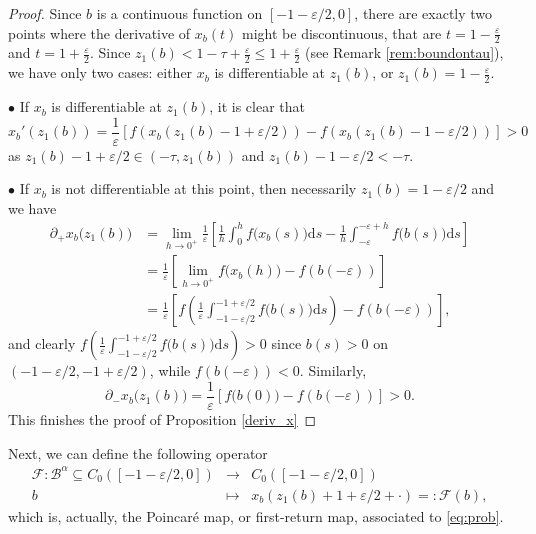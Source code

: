 \documentclass[a4paper,11pt]{article}
\theoremstyle{plain}
\theoremstyle{definition}
\theoremstyle{definition}
\newcommand{\B}{\mathcal{B}}
\newcommand{\Fcal}{\mathcal{F}}
\newcommand{\dd}{\mathrm{d}}
\numberwithin{equation}{section}
\begin{document}
\begin{proof}
	Since $b$ is a continuous function on $[-1-\varepsilon/2, 0]$, there are exactly two points where the derivative of $x_b(t)$ might be discontinuous, that are $t=1-\frac{\varepsilon}{2}$ and $t=1 +\frac{\varepsilon}{2}$. Since $z_1(b)< 1-\tau+\frac{\varepsilon}{2}\leq 1+\frac{\varepsilon}{2}$ (see Remark \ref{rem:boundontau}), we have only two cases: either $x_b$ is differentiable at $z_1(b)$, or $z_1(b)=1-\frac{\varepsilon}{2}$. 

	\noindent $\bullet$
If $x_b$ is differentiable at $z_1(b)$, it is clear that
\[
    x_b'(z_1(b)) = \frac{1}{\varepsilon}[ f(x_b(z_1(b)-1+\varepsilon/2)) - f(x_b(z_1(b)-1-\varepsilon/2)) ]>0
\]
	as $z_1(b)-1+\varepsilon/2\in(-\tau,z_1(b))$ and $z_1(b)-1-\varepsilon/2 < -\tau$. 

	\noindent$\bullet$ If $x_b$ is not differentiable at this point, then necessarily $z_1(b)=1-\varepsilon/2$ and we have
	\begin{align*}
		\partial_+ x_b\big(z_1(b)\big) &= \lim_{h\to 0^+} \frac{1}{\varepsilon}\left[\frac{1}{h}\int_0^h f\big(x_b(s)\big)\dd s-\frac{1}{h}\int_{{-\varepsilon}}^{-\varepsilon+h}f\big(b(s)\big)\dd s\right] \\
		&=\frac{1}{\varepsilon} \left[\lim_{h\to 0^+}f\big(x_b(h)\big) - f\left(b\left(-\varepsilon\right)\right)\right] \\
		&= \frac{1}{\varepsilon}\left[f\left(\frac{1}{\varepsilon}\int_{-1-\varepsilon/2}^{-1+\varepsilon/2} f\big(b(s)\big)\dd s \right)-f\left(b\left(-\varepsilon\right)\right)\right], 
	\end{align*}
	and clearly $f\left(\frac{1}{\varepsilon}\int_{-1-\varepsilon/2}^{-1+\varepsilon/2} f\big(b(s)\big)\dd s \right)>0$ since $b(s)>0$ on $(-1-\varepsilon/2, -1+\varepsilon/2)$, while $f\left(b\left(-\varepsilon\right)\right)<0$. Similarly, 
	\begin{equation*}
		\partial_- x_b\big(z_1(b)\big) = \frac{1}{\varepsilon}\left[f\big(b(0)\big)-f(b(-\varepsilon))\right]>0. 
	\end{equation*}
	This finishes the proof of Proposition \ref{deriv_x}
\end{proof}

Next, we can define the following operator
\begin{equation}\label{eq:poincare_operator}
    \begin{array}{ccl}
         \Fcal \colon \B^{\alpha} \subseteq C_0([-1-\varepsilon/2,0])& \longrightarrow & C_0([-1-\varepsilon/2,0])  \\
         b& \longmapsto &x_b(z_1(b) +1+\varepsilon/2+\cdot)=: \Fcal (b),
    \end{array}
\end{equation}
which is, actually, the Poincaré map, or first-return map, associated to \eqref{eq:prob}.
\end{document}

